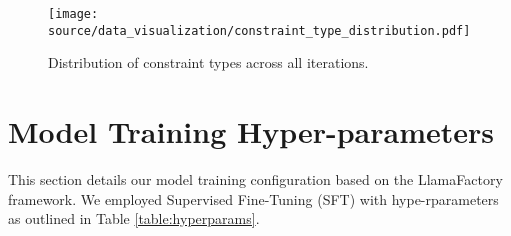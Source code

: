 
\begin{figure}[h]
\centering
\texttt{[image: source/data\_visualization/constraint\_type\_distribution.pdf]}
\caption{Distribution of constraint types across all iterations.}
\label{figure:model_comparison}
\end{figure}




\section{Model Training Hyper-parameters}
\label{appendix:hyper-parameters}

This section details our model training configuration based on the LlamaFactory \cite{zheng-etal-2024-llamafactory} framework. We employed Supervised Fine-Tuning (SFT) with hype-rparameters as outlined in Table \ref{table:hyperparams}.

\begin{table}[!h]
\centering
{}
\caption{Hyper-parameters for Supervised Fine-Tuning.}
\label{table:hyperparams}
\end{table}



